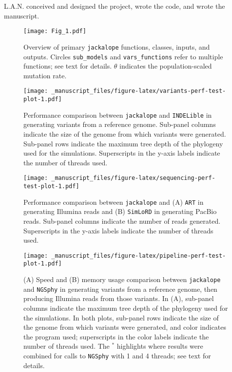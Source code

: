 \documentclass[12pt,]{article}
\begin{document}
L.A.N. conceived and designed the project, wrote the code, and wrote the manuscript.

\begin{figure}
\centering
\texttt{[image: Fig\_1.pdf]}
\caption{\label{fig:jackalope-overview-figure}Overview of primary \texttt{jackalope} functions, classes, inputs, and outputs. Circles \texttt{sub\_models} and \texttt{vars\_functions} refer to multiple functions; see text for details. \(\theta\) indicates the population-scaled mutation rate.}
\end{figure}

\begin{figure}
\centering
\texttt{[image: \_manuscript\_files/figure-latex/variants-perf-test-plot-1.pdf]}
\caption{\label{fig:variants-perf-test-plot}Performance comparison between \texttt{jackalope} and \texttt{INDELible} in generating variants from a reference genome. Sub-panel columns indicate the size of the genome from which variants were generated. Sub-panel rows indicate the maximum tree depth of the phylogeny used for the simulations. Superscripts in the y-axis labels indicate the number of threads used.}
\end{figure}

\begin{figure}
\centering
\texttt{[image: \_manuscript\_files/figure-latex/sequencing-perf-test-plot-1.pdf]}
\caption{\label{fig:sequencing-perf-test-plot}Performance comparison between \texttt{jackalope} and (A) \texttt{ART} in generating Illumina reads and (B) \texttt{SimLoRD} in generating PacBio reads. Sub-panel columns indicate the number of reads generated. Superscripts in the y-axis labels indicate the number of threads used.}
\end{figure}

\begin{figure}
\centering
\texttt{[image: \_manuscript\_files/figure-latex/pipeline-perf-test-plot-1.pdf]}
\caption{\label{fig:pipeline-perf-test-plot}(A) Speed and (B) memory usage comparison between \texttt{jackalope} and \texttt{NGSphy} in generating variants from a reference genome, then producing Illumina reads from those variants. In (A), sub-panel columns indicate the maximum tree depth of the phylogeny used for the simulations. In both plots, sub-panel rows indicate the size of the genome from which variants were generated, and color indicates the program used; superscripts in the color labels indicate the number of threads used. The \({}^{*}\) highlights where results were combined for calls to \texttt{NGSphy} with 1 and 4 threads; see text for details.}
\end{figure}
\end{document}
